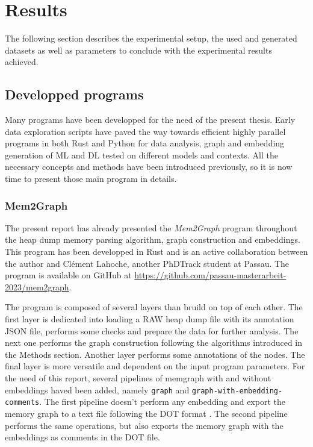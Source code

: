 \chapter{Results}\label{chap:results}

The following section describes the experimental setup, the used and generated datasets as well as parameters to conclude with the experimental results achieved.

\section{Developped programs}
Many programs have been developped for the need of the present thesis. Early data exploration scripts have paved the way towards efficient highly parallel programs in both Rust and Python for data analysis, graph and embedding generation of ML and DL tested on different models and contexts. All the necessary concepts and methods have been introduced previously, so it is now time to present those main program in details.

\subsection{Mem2Graph}
The present report has already presented the \textit{Mem2Graph} program throughout the heap dump memory parsing algorithm, graph construction and embeddings. This program has been developped in Rust and is an active collaboration between the author and Clément Lahoche, another PhDTrack student at Passau. The program is available on GitHub at \url{https://github.com/passau-masterarbeit-2023/mem2graph}. 

The program is composed of several layers than bruild on top of each other. The first layer is dedicated into loading a RAW heap dump file with its annotation JSON file, performs some checks and prepare the data for further analysis. The next one performs the graph construction following the algorithms introduced in the Methods section. Another layer performs some annotations of the nodes. The final layer is more versatile and dependent on the input program parameters. For the need of this report, several pipelines of memgraph with and without embeddings haved been added, namely \texttt{graph} and \texttt{graph-with-embedding-comments}. The first pipeline doesn't perform any embedding and export the memory graph to a text file following the DOT format \cite{DotFormat15}. The second pipeline performs the same operations, but also exports the memory graph with the embeddings as comments in the DOT file. 

